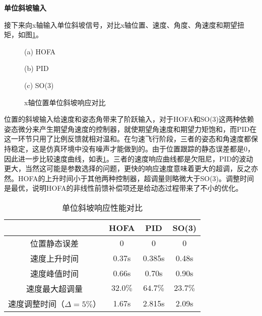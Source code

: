 \textbf{单位斜坡输入}

接下来向x轴输入单位斜坡信号，对比x轴位置、速度、角度、角速度和期望扭矩，如图\ref{matlab_t}。

\begin{figure}[h]
  \centering
  \begin{minipage}[t]{0.33\textwidth}
    \centering
    \caption*{(a) HOFA}
  \end{minipage}\hfill
  \begin{minipage}[t]{0.33\textwidth}
    \centering
    \caption*{(b) PID}
  \end{minipage}\hfill
  \begin{minipage}[t]{0.33\textwidth}
    \centering
    \caption*{(c) SO(3)}
  \end{minipage}
  \caption{x轴位置单位斜坡响应对比}
  \label{matlab_t}
\end{figure}

位置的斜坡输入给速度和姿态角带来了阶跃输入，对于HOFA和SO(3)这两种依赖姿态微分来产生期望角速度的控制器，就使期望角速度和期望力矩饱和，而PID在这一环节只用了比例反馈就相对温和。在匀速飞行阶段，三者的姿态和角速度都保持稳定，这是仿真环境中没有噪声才能做到的。由于位置跟踪的静态误差都是0，因此进一步比较速度曲线，如表\ref{matlab斜坡对比}。三者的速度响应曲线都是欠阻尼，PID的波动更大，当然这可能是参数选择的问题，更快的响应速度意味着更大的超调，反之亦然。HOFA的上升时间小于其他两种控制器，超调量则略微大于SO(3)。调整时间是最优，说明HOFA的非线性前馈补偿项还是给动态过程带来了不小的优化。

\begin{table}[h]
  \centering
  \caption{单位斜坡响应性能对比}
  \begin{tabular}{cccc}
      \toprule
      & HOFA & PID & SO(3) \\
      \midrule
    位置静态误差                  & 0    & 0 & 0 \\
    速度上升时间                   & 0.37s & 0.385s &0.48s \\
    速度峰值时间                  & 0.66s &0.70s  & 0.90s\\
    速度最大超调量                & $32.0\%$ & $64.7\%$  & $23.7\%$\\
    速度调整时间（$\Delta = 5\%$） & 1.67s &2.815s  & 2.09s\\
      \bottomrule
  \end{tabular}

  \label{matlab斜坡对比}
\end{table}


